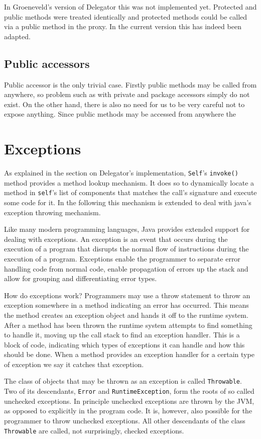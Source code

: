 \documentclass[a4paper,12pt]{book}
\begin{document}
In Groeneveld's version of Delegator this was not implemented yet. Protected and public methods were treated identically and protected methods could be called via a public method in the proxy. In the current version this has indeed been adapted.

\section*{Public accessors}
Public accessor is the only trivial case. Firstly public methods may be called from anywhere, so problem such as with private and package accessors simply do not exist. On the other hand, there is also no need for us to be very careful not to expose anything. Since public methods may be accessed from anywhere the 

\chapter{Exceptions}
As explained in the section on Delegator's implementation, \verb|Self|'s \verb|invoke()| method provides a method lookup mechanism. It does so to dynamically locate a method in \verb|self|'s list of components that matches the call's signature and execute some code for it. In the following this mechanism is extended to deal with java's exception throwing mechanism.

Like many modern programming languages, Java provides extended support for dealing with exceptions. An exception is an event that occurs during the execution of a program that disrupts the normal flow of instructions during the execution of a program. Exceptions enable the programmer to separate error handling code from normal code, enable propagation of errors up the stack and allow for grouping and differentiating error types.

How do exceptions work? Programmers may use a throw statement to throw an exception somewhere in a method indicating an error has occurred. This means the method creates an exception object and hands it off to the runtime system. After a method has been thrown the runtime system attempts to find something to handle it, moving up the call stack to find an exception handler. This is a block of code, indicating which types of exceptions it can handle and how this should be done. When a method provides an exception handler for a certain type of exception we say it catches that exception.

The class of objects that may be thrown as an exception is called \verb|Throwable|. Two of its descendants, \verb|Error| and \verb|RuntimeException|, form the roots of so called unchecked exceptions. In principle unchecked exceptions are thrown by the JVM, as opposed to explicitly in the program code. It is, however, also possible for the programmer to throw unchecked exceptions. All other descendants of the class \verb|Throwable| are called, not surprisingly, checked exceptions. 
\end{document}
